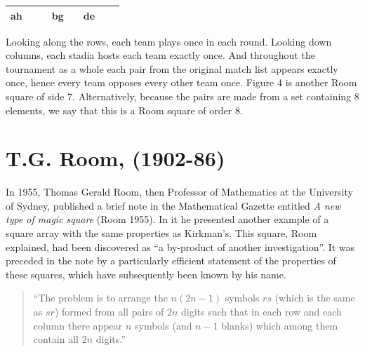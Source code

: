 \documentclass[
  12pt,
  a4paper]{book}
\begin{document}
\begin{longtable}[]{@{}cccccccc@{}}
\begin{minipage}[t]{0.05\columnwidth}
ah\strut
\end{minipage} & \begin{minipage}[t]{0.05\columnwidth}\centering
\strut
\end{minipage} & \begin{minipage}[t]{0.05\columnwidth}\centering
\strut
\end{minipage} & \begin{minipage}[t]{0.05\columnwidth}\centering
bg\strut
\end{minipage} & \begin{minipage}[t]{0.05\columnwidth}\centering
\strut
\end{minipage} & \begin{minipage}[t]{0.05\columnwidth}\centering
de\strut
\end{minipage}\tabularnewline
\bottomrule
\end{longtable}

Looking along the rows, each team plays once in each round. Looking down
columns, each stadia hosts each team exactly once. And throughout the
tournament as a whole each pair from the original match list appears
exactly once, hence every team opposes every other team once. Figure 4
is another Room square of side 7. Alternatively, because the pairs are
made from a set containing 8 elements, we say that this is a Room square
of order 8.

\hypertarget{t.g.-room-1902-86}{%
\section{T.G. Room, (1902-86)}\label{t.g.-room-1902-86}}

In 1955, Thomas Gerald Room, then Professor of Mathematics at the
University of Sydney, published a brief note in the Mathematical Gazette
entitled \emph{A new type of magic square} (Room 1955). In it he
presented another example of a square array with the same properties as
Kirkman's. This square, Room explained, had been discovered as ``a
by-product of another investigation''. It was preceded in the note by a
particularly efficient statement of the properties of these squares,
which have subsequently been known by his name.

\begin{quote}
``The problem is to arrange the \(n(2n-1)\) symbols \(rs\) (which is the
same as \(sr\)) formed from all pairs of \(2n\) digits such that in each
row and each column there appear \(n\) symbols (and \(n-1\) blanks)
which among them contain all \(2n\) digits.''
\end{quote}
\end{document}

